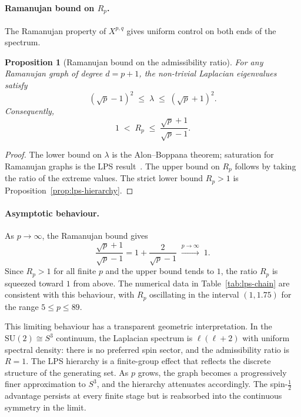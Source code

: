 \documentclass[11pt,a4paper]{article}
\newtheorem{proposition}{Proposition}
\begin{document}
  \paragraph{Ramanujan bound on $R_p$.}
    The Ramanujan property of $X^{p,q}$ gives uniform control on both ends
    of the spectrum.

    \begin{proposition}[Ramanujan bound on the admissibility ratio]
      \label{prop:ramanujan-R}
      For any Ramanujan graph of degree $d = p+1$, the non-trivial Laplacian
      eigenvalues satisfy
      \begin{equation}
        \left(\sqrt{p} - 1\right)^2 \;\leq\; \lambda \;\leq\; \left(\sqrt{p}+1\right)^2.
        \label{eq:ramanujan-window}
      \end{equation}
      Consequently,
      \begin{equation}
        1 \;<\; R_p \;\leq\; \frac{\sqrt{p}+1}{\sqrt{p}-1}.
        \label{eq:ramanujan-R-bound}
      \end{equation}
    \end{proposition}

    \begin{proof}
      The lower bound on $\lambda$ is the Alon--Boppana theorem; saturation for
      Ramanujan graphs is the LPS result~\cite{LPS1988}.
      The upper bound on $R_p$ follows by taking the ratio of the extreme values.
      The strict lower bound $R_p > 1$ is Proposition~\ref{prop:lps-hierarchy}.
    \end{proof}

  \paragraph{Asymptotic behaviour.}
    As $p \to \infty$, the Ramanujan bound gives
    \begin{equation}
      \frac{\sqrt{p}+1}{\sqrt{p}-1}
      = 1 + \frac{2}{\sqrt{p}-1}
      \;\xrightarrow{p\to\infty}\; 1.
      \label{eq:R-bound-limit}
    \end{equation}
    Since $R_p > 1$ for all finite $p$ and the upper bound tends to $1$, the
    ratio $R_p$ is squeezed toward $1$ from above.
    The numerical data in Table~\ref{tab:lps-chain} are consistent with this
    behaviour, with $R_p$ oscillating in the interval $(1, 1.75)$ for the range
    $5 \leq p \leq 89$.

    This limiting behaviour has a transparent geometric interpretation.
    In the $\mathrm{SU}(2) \cong S^3$ continuum, the Laplacian spectrum is
    $\ell(\ell+2)$ with uniform spectral density: there is no preferred spin
    sector, and the admissibility ratio is $R = 1$.
    The LPS hierarchy is a finite-group effect that reflects the discrete
    structure of the generating set.
    As $p$ grows, the graph becomes a progressively finer approximation to
    $S^3$, and the hierarchy attenuates accordingly.
    The spin-$\tfrac{1}{2}$ advantage persists at every finite stage but is
    reabsorbed into the continuous symmetry in the limit.
\end{document}
